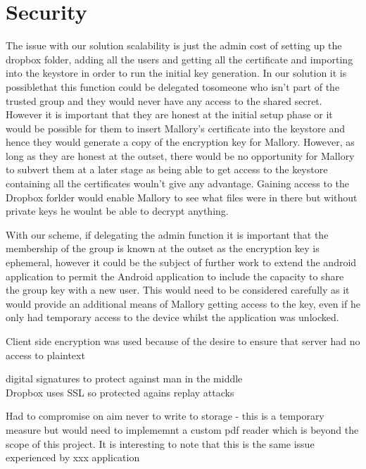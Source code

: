 
\chapter{Security}
\label{cha:security}
The issue with our solution scalability is just the admin cost of setting up the dropbox folder, adding all the users and getting all the certificate and importing into the keystore in order to run the initial key generation.  In our solution it is possiblethat this function could be delegated tosomeone who isn’t part of the trusted group and they would never have any access to the shared secret.  However it is important that they are honest at the initial setup phase or it would be possible for them to insert Mallory’s certificate into the keystore and hence they would generate a copy of the encryption key for Mallory.  However, as long as they are honest at the outset, there would be no opportunity for Mallory to subvert them at a later stage as being able to get access to the keystore containing all the certificates wouln’t give any advantage.  Gaining access to the Dropbox forlder would enable Mallory to see what files were in there but without private keys he woulnt be able to decrypt anything.


With our scheme, if delegating the admin function it is important that the membership of the group is known at the outset as the encryption key is ephemeral, however it could be the subject of further work to extend the android application to permit the Android application to include the capacity to share the group key with a new user.  This would need to be considered carefully as it would provide an additional means of Mallory getting access to the key, even if he only had temporary access to the device whilst the application was unlocked.  





 
 Client side encryption was used because of the desire to ensure that server had no access to plaintext
 
 digital signatures to protect against man in the middle \\
 
 Dropbox uses SSL so protected agains replay attacks
 
 Had to compromise on aim never to write to storage - this is a temporary measure but would need to implememnt a custom pdf reader which is beyond the scope of this project.  It is interesting to note that this is the same issue experienced by xxx application
 
